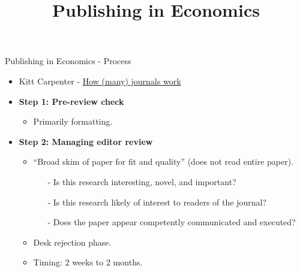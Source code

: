\documentclass{beamer}
\title[]{Publishing in Economics}
\date{}
\begin{document}
\maketitle

\beamertemplatenavigationsymbolsempty
\begin{frame}{Publishing in Economics - Process}
    \begin{itemize}
        \item Kitt Carpenter - \color{blue} \href{https://www.appam.org/how-many-journals-work-a-far-from-incomplete-guide-for-public-policyeconomics-scholars/?pg=58&F_All=y}{How (many) journals work}
    \end{itemize}
    \bigskip
    \begin{itemize}
        \pause \item \textbf{Step 1: Pre-review check} 
        \begin{itemize}
            \item Primarily formatting.
        \end{itemize}
        \medskip
        \pause \item \textbf{Step 2: Managing editor review}
        \begin{itemize}
            \item ``Broad skim of paper for fit and quality'' (does not read entire paper).
            \begin{itemize}
                \item[-] Is this research interesting, novel, and important?
                \item[-] Is this research likely of interest to readers of the journal?
                \item[-] Does the paper appear competently communicated and executed?
            \end{itemize}
            \item Desk rejection phase.
            \item Timing: 2 weeks to 2 months.
        \end{itemize}
    \end{itemize}          
\end{frame}
\end{document}
